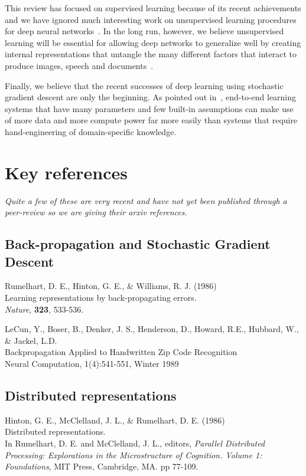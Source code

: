 \documentclass[]{article}
\begin{document}
This review has focused on supervised learning because of its recent
achievements and we have ignored much interesting work on unsupervised
learning procedures for deep neural networks~\cite{deep-boltz, wake-sleep,
  google-cat, denoising-auto, ranzato-pami, more recent}. In the long run,
however, we believe unsupervised learning will be essential for allowing
deep networks to generalize well by creating internal representations that
untangle the many different factors that interact to produce images, speech
and documents~\cite{Yann, Yoshua: untangling papers,Bengio-Courville-Vincent-TPAMI2013}.

Finally, we believe that the recent successes of deep learning using
stochastic gradient descent are only the beginning.  As pointed out
in~\citet{Bengio+Lecun-chapter2007-small}, end-to-end learning
systems that have many parameters and few built-in assumptions can make use
of more data and more compute power far more easily than systems that
require hand-engineering of domain-specific knowledge.

 
\section{Key references}
{\it Quite a few of these are very recent and have not yet been published
  through a peer-review so we are giving their arxiv references}.

\subsection{Back-propagation and Stochastic Gradient Descent}
Rumelhart, D. E., Hinton, G. E., \& Williams, R. J. (1986)\\ Learning
representations by back-propagating errors.\\ {\it Nature}, {\bf 323},
533-536.

LeCun, Y., Boser, B., Denker, J. S., Henderson, D., Howard, R.E., Hubbard,
W., \& Jackel, L.D.\\ Backpropagation Applied to Handwritten Zip Code
Recognition\\ Neural Computation, 1(4):541-551, Winter 1989

\subsection{Distributed representations}
Hinton, G. E., McClelland, J. L., \& Rumelhart, D. E. (1986)\\ Distributed
representations.\\ In Rumelhart, D. E. and McClelland, J. L., editors, {\it
  Parallel Distributed Processing: Explorations in the Microstructure of
  Cognition. Volume 1: Foundations}, MIT Press, Cambridge, MA. pp 77-109.
\end{document}
